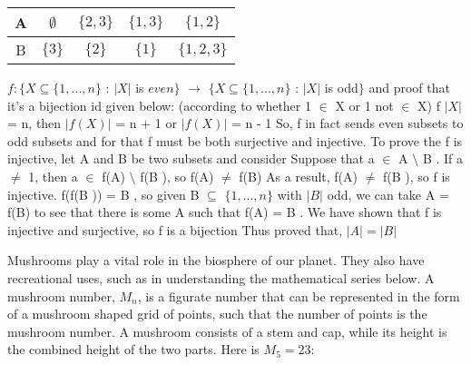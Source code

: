 \documentclass[addpoints]{exam}
\begin{document}
\begin{questions}
\begin{center}

  \begin{tabular}{ |c || c | c | c |c |}
    \hline
 A & $\emptyset$ & $\{2,3\}$ & $\{1,3\}$ & $\{1,2\}$ \\ \hline
 B & $\{3\}$ & $\{2\}$ & $\{1\}$ & $\{1,2,3\}$\\\hline
\end{tabular}
\end{center}

  \begin{solution}\newline
    $f : \{X \subseteq \{1,..., n\}$ : $|X|$ is $even\}$ $\rightarrow$  $\{X \subseteq \{1, ..., n\}$ : $|X|$ is odd$\}$ \newline
    and proof that it’s a bijection id given below: \newline
    (according to whether 1 $\in$ X or 1 not $\in $ X) \newline
    f $|X|$ = n, then $|f(X)|$ = n + 1 or $|f(X)|$ = n - 1 \newline
    So, f in fact sends even subsets to odd subsets and for that f must be both surjective and injective. \newline
    To prove the f is injective, let A and B be two subsets and consider \newline 
    Suppose that a $\in$ A $\setminus$ B . If  a $\neq$ 1, then \newline
    a $\in$ f(A) $\setminus$ f(B ), so f(A) $\neq$ f(B) \newline
    As a result,\newline 
    f(A) $\neq$ f(B ), so f is injective.\newline
    f(f(B )) = B , so given   \newline
    B $\subseteq$ $\{1, . . . , n\}$ with $|B |$ odd, we can take A = f(B) to see that there is some A such that f(A) = B .  \newline
    We have shown that f is injective and surjective, so f is a bijection   \newline
    Thus proved that, \newline
    $|A|=|B|$
    
    
    
    
  \end{solution}
  
\question Mushrooms play a vital role in the biosphere of our planet. They also have recreational uses, such as in understanding the mathematical series below. A mushroom number, $M_n$, is a figurate number that can be represented in the form of a mushroom shaped grid of points, such that the number of points is the mushroom number. A mushroom consists of a stem and cap, while its height is the combined height of the two parts. Here is $M_5=23$:


\end{questions}
\end{document}
